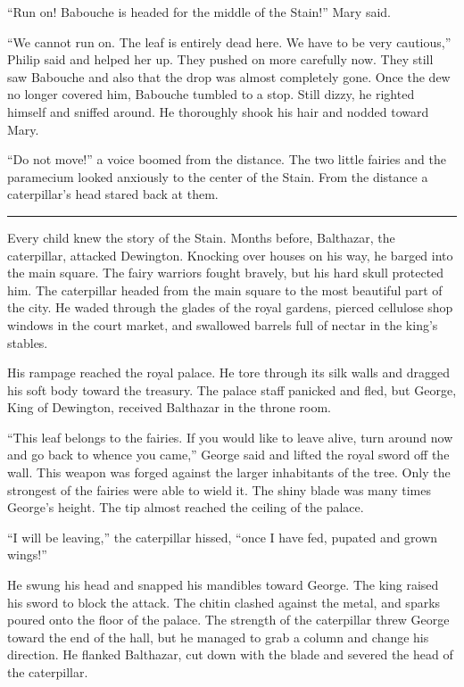 \documentclass[10pt]{memoir}
\renewcommand{\pfbreakdisplay}{\bigskip \ding{166} \bigskip}
\newcommand{\secbreak}{\fancybreak{\pfbreakdisplay}}
\begin{document}
``Run on! Babouche is headed for the middle of the Stain!'' Mary said.

``We cannot run on. The leaf is entirely dead here. We have to be very
cautious,'' Philip said and helped her up. They pushed on more carefully now.
They still saw Babouche and also that the drop was almost completely gone. Once
the dew no longer covered him, Babouche tumbled to a stop. Still dizzy, he
righted himself and sniffed around. He thoroughly shook his hair and nodded
toward Mary.

``Do not move!'' a voice boomed from the distance. The two little fairies and
the paramecium looked anxiously to the center of the Stain. From the distance a
caterpillar's head stared back at them.

\secbreak

Every child knew the story of the Stain. Months before, Balthazar, the
caterpillar, attacked Dewington. Knocking over houses on his way, he barged
into the main square. The fairy warriors fought bravely, but his hard skull
protected him. The caterpillar headed from the main square to the most
beautiful part of the city. He waded through the glades of the royal gardens,
pierced cellulose shop windows in the court market, and swallowed barrels full
of nectar in the king's stables.

His rampage reached the royal palace. He tore through its silk walls and
dragged his soft body toward the treasury. The palace staff panicked and fled,
but George, King of Dewington, received Balthazar in the throne room.

``This leaf belongs to the fairies. If you would like to leave alive, turn
around now and go back to whence you came,'' George said and lifted the royal
sword off the wall. This weapon was forged against the larger inhabitants of
the tree. Only the strongest of the fairies were able to wield it. The shiny
blade was many times George's height. The tip almost reached the ceiling of the
palace.

``I will be leaving,'' the caterpillar hissed, ``once I have fed, pupated and
grown wings!''

He swung his head and snapped his mandibles toward George. The king raised his
sword to block the attack. The chitin clashed against the metal, and sparks
poured onto the floor of the palace. The strength of the caterpillar threw
George toward the end of the hall, but he managed to grab a column and change
his direction. He flanked Balthazar, cut down with the blade and severed the
head of the caterpillar.
\end{document}
